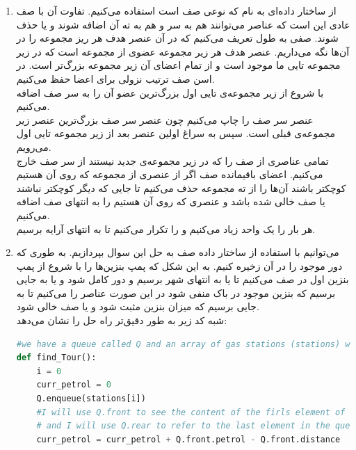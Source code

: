 \documentclass{article}
\begin{document}
\begin{enumerate}
\begin{enumerate}
	\end{enumerate}
	\item از ساختار داده‌ای به نام  که نوعی صف است استفاده می‌کنیم. تفاوت آن با صف عادی این است که عناصر می‌توانند هم به سر و هم به ته آن اضافه شوند و یا حذف شوند. صفی به طول  تعریف می‌کنیم که در آن عنصر هدف هر ریز مجموعه را در آن‌ها نگه می‌داریم. عنصر هدف هر زیر مجموعه عضوی از مجموعه است که در زیر مجموعه  تایی ما موجود است و از تمام اعضای آن زیر مجموعه بزرگ‌تر است. در اسن صف ترتیب نزولی برای اعضا حفظ می‌کنیم.\\
	با شروع از زیر مجموعه‌ی  تایی اول بزرگ‌ترین عضو آن را به سر صف اضافه می‌کنیم.\\
	 عنصر سر صف را چاپ می‌کنیم چون عنصر سر صف بزرگ‌ترین عنصر زیر مجموعه‌ی قبلی است. سپس به سراغ اولین عنصر بعد از زیر مجموعه  تایی اول می‌رویم. \\
	 \lr{*} تمامی عناصری از صف را که در زیر مجموعه‌ی جدید نیستند از سر صف خارج می‌کنیم. اعضای باقیمانده صف اگر از عنصری از مجموعه که روی آن هستیم کوچکتر باشند آن‌ها را از ته مجموعه حذف می‌کنیم تا جایی که دیگر کوچکتر نباشند یا صف خالی شده باشد و عنصری که روی آن هستیم را به انتهای صف اضافه می‌کنیم. \\
	 هر بار  را یک واحد زیاد می‌کنیم و  \lr{*} را تکرار می‌کنیم تا به انتهای آرایه برسیم. 
	\item می‌توانیم با استفاده از ساختار داده صف به حل این سوال بپردازیم. به طوری که دور موجود را در آن زخیره کنیم. به این شکل که پمپ بنزین‌ها را با شروع از پمپ بنزین اول در صف  می‌کنیم تا یا به انتها‌ی شهر برسیم و دور کامل شود و یا به جایی برسیم که بنزین موجود در باک منفی شود در این صورت عناصر را  می‌کنیم تا به جایی برسیم که میزان بنزین مثبت شود و یا صف خالی شود. \\
	شبه کد زیر به طور دقیق‌تر راه حل را نشان می‌دهد:\\
\begin{latin}
\begin{flushright}				
\begin{lstlisting}[language=Python]
#we have a queue called Q and an array of gas stations (stations) which have two variables: distance and petrol 
def find_Tour():
	i = 0
	curr_petrol = 0
	Q.enqueue(stations[i])
	#I will use Q.front to see the content of the firls element of the queue
	# and I will use Q.rear to refer to the last element in the queue
	curr_petrol = curr_petrol + Q.front.petrol - Q.front.distance


\end{lstlisting}
\end{flushright}
\end{latin}
\end{enumerate}
\end{document}
